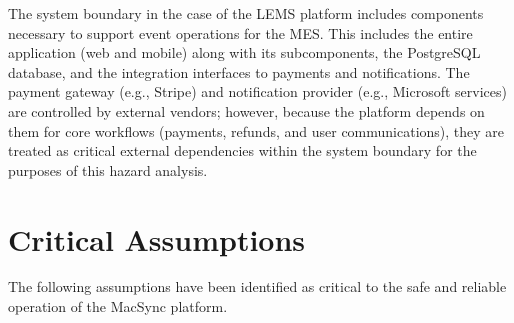 \documentclass{article}
\begin{document}
The system boundary in the case of the LEMS platform includes components necessary to support event operations for the MES. This includes the entire application (web and mobile) along with its subcomponents, the PostgreSQL database, and the integration interfaces to payments and notifications. The payment gateway (e.g., Stripe) and notification provider (e.g., Microsoft services) are controlled by external vendors; however, because the platform depends on them for core workflows (payments, refunds, and user communications), they are treated as critical external dependencies within the system boundary for the purposes of this hazard analysis.

\section{Critical Assumptions}

The following assumptions have been identified as critical to the safe and reliable operation of the MacSync platform.
\end{document}
